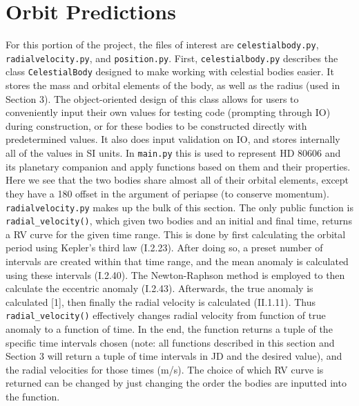 \documentclass[12pt]{article}
\begin{document}
\section{Orbit Predictions}
For this portion of the project, the files of interest are \texttt{celestialbody.py}, \texttt{radialvelocity.py}, and \texttt{position.py}. First, \texttt{celestialbody.py} describes the class \texttt{CelestialBody} designed to make working with celestial bodies easier. It stores the mass and orbital elements of the body, as well as the radius (used in Section 3). The object-oriented design of this class allows for users to conveniently input their own values for testing code (prompting through IO) during construction, or for these bodies to be constructed directly with predetermined values. It also does input validation on IO, and stores internally all of the values in SI units. In \texttt{main.py} this is used to represent HD 80606 and its planetary companion and apply functions based on them and their properties. Here we see that the two bodies share almost all of their orbital elements, except they have a 180{\degree} offset in the argument of periapse (to conserve momentum).\\
\indent \texttt{radialvelocity.py} makes up the bulk of this section. The only public function is \\\texttt{radial\_velocity()}, which given two bodies and an initial and final time, returns a RV curve for the given time range. This is done by first calculating the orbital period using Kepler's third law (I.2.23). After doing so, a preset number of intervals are created within that time range, and the mean anomaly is calculated using these intervals (I.2.40). The Newton-Raphson method is employed to then calculate the eccentric anomaly (I.2.43). Afterwards, the true anomaly is calculated [1], then finally the radial velocity is calculated (II.1.11). Thus \texttt{radial\_velocity()} effectively changes radial velocity from function of true anomaly to a function of time. In the end, the function returns a tuple of the specific time intervals chosen (note: all functions described in this section and Section 3 will return a tuple of time intervals in JD and the desired value), and the radial velocities for those times (m/s). The choice of which RV curve is returned can be changed by just changing the order the bodies are inputted into the function.\\\\
\end{document}
